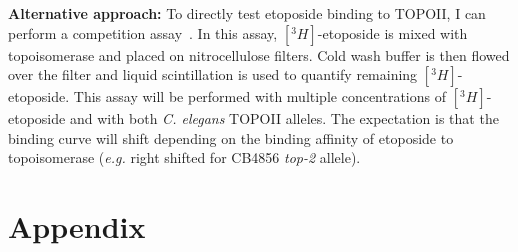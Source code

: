 \documentclass[12pt]{article}
\begin{document}
\vspace{5pt}
{\bf Alternative approach: }To directly test etoposide binding to TOPOII, I can perform a competition assay~\cite{Kingma:1999cc}. In this assay, $[^{3}H]$-etoposide is mixed with topoisomerase and placed on nitrocellulose filters. Cold wash buffer is then flowed over the filter and liquid scintillation is used to quantify remaining $[^{3}H]$-etoposide. This assay will be performed with multiple concentrations of $[^{3}H]$-etoposide and with both {\it C. elegans} TOPOII alleles. The expectation is that the binding curve will shift depending on the binding affinity of etoposide to topoisomerase ({\it e.g.} right shifted for CB4856 {\it top-2} allele). 

\vspace{5pt} 







\newpage



\newpage
\section{Appendix}
\setcounter{figure}{0}  
\end{document}
